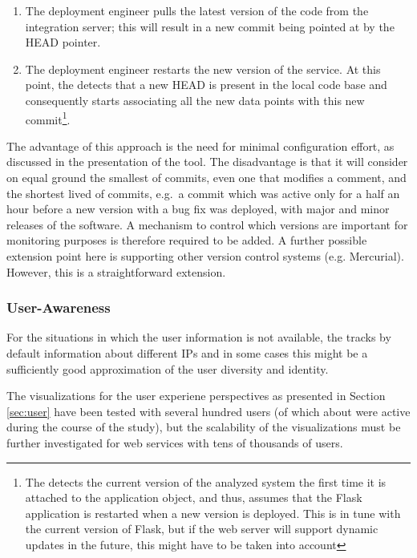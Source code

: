 \documentclass{sig-alternate-05-2015}
\begin{document}
  \begin{enumerate}
    \item The deployment engineer pulls the latest version of the code from the integration server; this will result in a new commit being pointed at by the HEAD pointer. %
    \item The deployment engineer restarts the new version of the service. At this point, the \tool detects that a new HEAD is present in the local code base and consequently starts associating all the new data points with this new commit\footnote{The \tool detects the current version of the analyzed system the first time it is attached to the application object, and thus, assumes that the Flask application is restarted when a new version is deployed. This is in tune with the current version of Flask, but if the web server will support dynamic updates in the future, this might have to be taken into account}.
  \end{enumerate}

  The advantage of this approach is the need for minimal configuration effort, as discussed in the presentation of the tool. The disadvantage is that it will consider on equal ground the smallest of commits, even one that modifies a comment, and the shortest lived of commits, e.g.~a commit which was active only for a half an hour before a new version with a bug fix was deployed, with major and minor releases of the software. %
  A mechanism to control which versions are important for monitoring purposes is therefore required to be added.
%
  A further possible extension point here is supporting other version control systems (e.g. Mercurial). However, this is a straightforward extension.



  \subsubsection{User-Awareness }

    For the situations in which the user information is not available, the \tool tracks by default information about different IPs and in some cases this might be a sufficiently good approximation of the user diversity and identity. 

    The visualizations for the user experiene perspectives as presented in Section \ref{sec:user} have been tested with several hundred users (of which about \activeUserCount were active during the course of the study), but the scalability of the visualizations must be further investigated for web services with tens of thousands of users.
\end{document}

